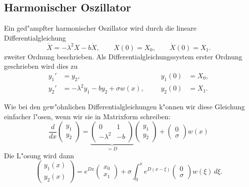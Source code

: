 \subsection{Harmonischer Oszillator\label{linear:harmosz}}
Ein ged"ampfter harmonischer Oszillator wird durch die lineare
%
%
Differentialgleichung
\begin{equation}
\ddot X=-\lambda^2 X-b\dot X,\qquad X(0)=X_0,\qquad \dot X(0)=X_1.
\label{linear:harmosz-dgl2}
\end{equation}
zweiter Ordnung beschrieben.
Als Differentialgleichungssystem erster Ordnung geschrieben wird dies zu
\begin{equation}
\begin{aligned}
y_1'&=y_2,                              &&&y_1(0)&=X_0, \\
y_2'&=-\lambda^2 y_1-by_2 + \sigma w(x),&&&y_2(0)&=X_1.
\end{aligned}
\label{stochastsich:harmosz-dgl1}
\end{equation}

Wie bei den gew"ohnlichen Differentialgleichungen k"onnen wir diese
Gleichung einfacher l"osen, wenn wir sie in Matrixform schreiben:
\begin{equation}
\frac{d}{dx} \begin{pmatrix}y_1\\y_2\end{pmatrix}
=
\underbrace{
\begin{pmatrix}
         0& 1\\
-\lambda^2&-b
\end{pmatrix}}_{\textstyle=D}
\begin{pmatrix}y_1\\y_2\end{pmatrix}
+
\begin{pmatrix}
0\\\sigma
\end{pmatrix}w(x)
\end{equation}
Die L"osung wird dann
\begin{equation}
\begin{pmatrix}
y_1(x)\\y_2(x)
\end{pmatrix}
=
e^{Dx}\begin{pmatrix}x_0\\x_1\end{pmatrix}
+
\sigma \int_0^x e^{D(x-\xi)}\begin{pmatrix}0\\\sigma\end{pmatrix}w(\xi)\,d\xi.
\label{linear:harmosz-explsg}
\end{equation}

